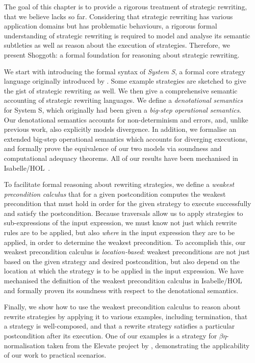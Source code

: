 The goal of this chapter is to provide a rigorous treatment of strategic rewriting, that we believe lacks so far. Considering that strategic rewriting has various application domains but has problematic behaviours, a rigorous formal understanding of strategic rewriting is required to model and analyse its semantic subtleties as well as reason about the execution of strategies. Therefore, we present Shoggoth: a formal foundation for reasoning about strategic rewriting.

We start with introducing the formal syntax of \emph{System S}, a formal core strategy language
originally introduced by \citet{VISSER1998422}. Some example strategies are sketched to give the gist of strategic rewriting as well. We then give a comprehensive semantic
accounting of strategic rewriting languages. We define a \emph{denotational semantics} for System
S, which originally had been given
a \emph{big-step operational semantics}. Our denotational semantics accounts for non-determinism and errors, and, unlike previous work, also explicitly models divergence.
In addition, we formalise an extended big-step operational semantics which accounts for diverging executions, and formally prove the equivalence of our two models via soundness and computational adequacy theorems. All of our results have been mechanised in Isabelle/HOL~\citep{NipkowPauWen:IsabelleTut:2002}.

To facilitate formal reasoning about rewriting strategies, we define a \emph{weakest precondition calculus} that for a given postcondition computes the weakest precondition that must hold in order for the given strategy to execute successfully and satisfy the postcondition. Because traversals allow us to apply strategies to sub-expressions of the input expression, we must know not just which rewrite rules are to be applied, but also \emph{where} in the input expression they are to be applied, in order to determine the weakest precondition. To accomplish this, our weakest precondition calculus is \emph{location-based}: weakest preconditions are not just based on the given strategy and desired postcondition, but also depend on the location at which the strategy is to be applied in the input expression. We have mechanised the definition of the weakest precondition calculus in Isabelle/HOL and formally proven its soundness with respect to the denotational semantics. 

Finally, we show how to use the weakest precondition calculus to reason about rewrite strategies by applying it to various examples, including termination, that a strategy is well-composed, and that a rewrite strategy satisfies a particular postcondition after its execution.
One of our examples is a strategy for $\beta\eta$-normalisation taken from the Elevate project by \citet{DBLP:journals/pacmpl/HagedornLKQGS20}, demonstrating the applicability of our work to practical scenarios.


